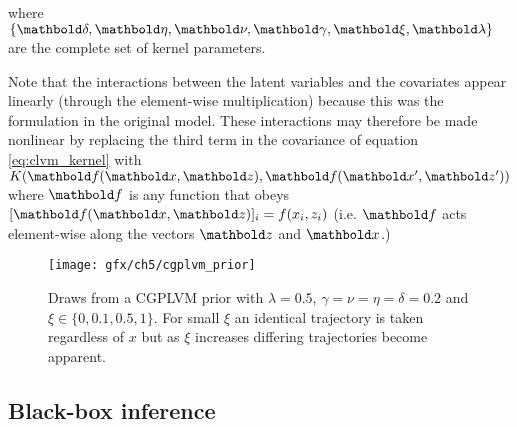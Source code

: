 where $\{\mbdelta, \mbeta, \mbnu, \mbgamma, \mbxi, \mblambda\}$ are the complete set of kernel parameters.


Note that the interactions between the latent variables and the covariates appear linearly (through the element-wise multiplication) because this was the formulation in the original model. These interactions may therefore be made nonlinear by replacing the third term in the covariance of equation \ref{eq:clvm_kernel} with $K(\mbf(\mbx, \mbz), \mbf(\mbx', \mbz'))$ where $\mbf$ is any function that obeys $[\mbf(\mbx, \mbz)]_i = f(x_i, z_i)$ (i.e. $\mbf$ acts element-wise along the vectors $\mbz$ and $\mbx$.)

\begin{figure}
  \centering
\texttt{[image: gfx/ch5/cgplvm\_prior]}
\caption{Draws from a CGPLVM prior with $\lambda = 0.5$, $\gamma = \nu = \eta = \delta = 0.2$ and $\xi \in \{0, 0.1, 0.5, 1\}$. For small $\xi$ an identical trajectory is taken regardless of $x$ but as $\xi$ increases differing trajectories become apparent.}
\end{figure}

\subsection{Black-box inference}
